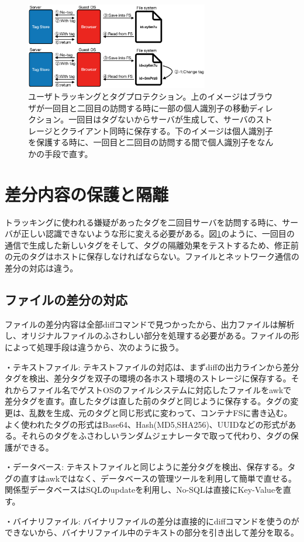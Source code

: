 \documentclass[a4paper,twocolumn,10pt]{jarticle}
\begin{document}
\begin{figure}[ht]
\begin{center}
\includegraphics[width=8cm]{img/tag.eps}
\caption{ユーザトラッキングとタグプロテクション。上のイメージはブラウザが一回目と二回目の訪問する時に一部の個人識別子の移動ディレクション。一回目はタグないからサーバが生成して、サーバのストレージとクライアント同時に保存する。下のイメージは個人識別子を保護する時に、一回目と二回目の訪問する間で個人識別子をなんかの手段で直す。}
\label{figure:tag}
\end{center}
\end{figure}


\section{差分内容の保護と隔離}
\label{cha:protect}
トラッキングに使われる嫌疑があったタグを二回目サーバを訪問する時に、サーバが正しい認識できないような形に変える必要がある。図\ref{figure:tag}のように、一回目の通信で生成した新しいタグをそして、タグの隔離効果をテストするため、修正前の元のタグはホストに保存しなければならない。ファイルとネットワーク通信の差分の対応は違う。

\subsection{ファイルの差分の対応}
ファイルの差分内容は全部diffコマンドで見つかったから、出力ファイルは解析し、オリジナルファイルのふさわしい部分を処理する必要がある。ファイルの形によって処理手段は違うから、次のように扱う。

\begin{description}
\item{・テキストファイル: }
テキストファイルの対応は、まずdiffの出力ラインから差分タグを検出、差分タグを双子の環境の各ホスト環境のストレージに保存する。それからファイル名でゲストOSのファイルシステムに対応したファイルをawkで差分タグを直す。直したタグは直した前のタグと同じように保存する。タグの変更は、乱数を生成、元のタグと同じ形式に変わって、コンテナFSに書き込む。よく使われたタグの形式はBase64、Hash(MD5,SHA256)、UUIDなどの形式がある。それらのタグをふさわしいランダムジェナレータで取って代わり、タグの保護ができる。
\item{・データベース: }
テキストファイルと同じように差分タグを検出、保存する。タグの直すはawkではなく、データベースの管理ツールを利用して簡単で直せる。関係型データベースはSQLのupdateを利用し、No-SQLは直接にKey-Valueを直す。
\item{・バイナリファイル: }
バイナリファイルの差分は直接的にdiffコマンドを使うのができないから、バイナリファイル中のテキストの部分を引き出して差分を取る。
\end{description}
\end{document}

